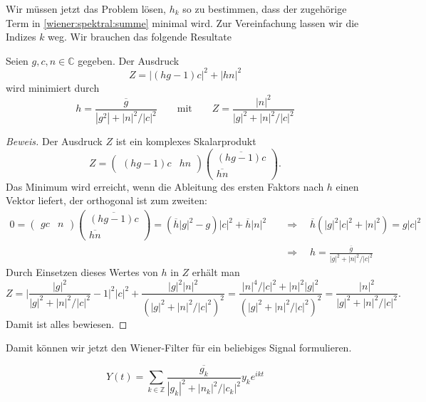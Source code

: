 Wir müssen jetzt das Problem lösen, $h_k$ so zu bestimmen, dass
der zugehörige Term in \eqref{wiener:spektral:summe} minimal wird.
Zur Vereinfachung lassen wir die Indizes $k$ weg.
Wir brauchen das folgende Resultate

\begin{hilfssatz}
Seien $g,c,n\in\mathbb C$ gegeben.
Der Ausdruck
\[
Z = |(hg-1)c|^2 + |hn|^2
\]
wird minimiert durch 
\[
h = \frac{\overline{g}}{|g^2|+|n|^2/|c|^2}
\qquad\text{mit}\qquad
Z = \frac{|n|^2}{|g|^2 + |n|^2/|c|^2}
\]
\end{hilfssatz}

\begin{proof}[Beweis]
Der Ausdruck $Z$ ist ein komplexes Skalarprodukt
\[
Z
=
\begin{pmatrix}
(hg-1)c&hn
\end{pmatrix}
\begin{pmatrix}
\overline{(hg-1)c}\\\overline{hn}
\end{pmatrix}.
\]
Das Minimum wird erreicht, wenn die Ableitung des ersten Faktors nach
$h$ einen Vektor liefert, der orthogonal ist zum zweiten:
\begin{align*}
0
=
\begin{pmatrix}
gc&n
\end{pmatrix}
\begin{pmatrix}
\overline{(hg-1)c}\\\overline{hn}
\end{pmatrix}
=
(\overline{h} |g|^2 - g )|c|^2
+
\overline{h} |n|^2
\quad&\Rightarrow\quad
\overline{h}(|g|^2|c|^2+|n|^2)=g|c|^2
\\
\quad&\Rightarrow\quad
h=\frac{\overline{g}}{|g|^2 + |n|^2/|c|^2}
\end{align*}
Durch Einsetzen dieses Wertes von $h$ in $Z$ erhält man
\[
Z
=
\biggl|
\frac{|g|^2}{|g|^2+|n|^2/|c|^2}
-1
\biggr|^2 |c|^2
+
\frac{|g|^2|n|^2}{(|g|^2+|n|^2/|c|^2)^2}
=
\frac{|n|^4/|c|^2 + |n|^2 |g|^2}{(|g|^2+|n|^2/|c|^2)^2}
=
\frac{|n|^2}{|g|^2+|n|^2/ |c|^2}.
\]
Damit ist alles bewiesen.
\end{proof}

Damit können wir jetzt den Wiener-Filter für ein beliebiges Signal
formulieren.

\begin{satz}
\[
Y(t)
=
\sum_{k\in\mathbb Z}
\frac{\overline{g_k}}{|g_k|^2+|n_k|^2/|c_k|^2} y_k e^{ikt}
\]
\end{satz}

%
%

